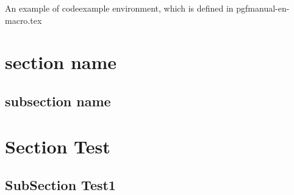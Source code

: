 \documentclass[10pt,a4paper,extrafontsizes]{memoir}
\begin{document}


An example of codeexample environment, which is defined in pgfmanual-en-macro.tex
\begin{codeexample}
\usepackage{pgfplots}
\pgfplotsset{compat=1.3}
\end{codeexample}



\section{section name} %
\label{sec:section_name}



\subsection{subsection name} %
\label{sub:subsection_name}


\section{Section Test}

\subsection{SubSection Test1}
\label{sub:subsec1}
\end{document}
